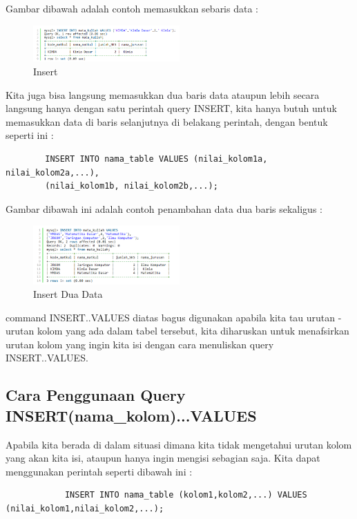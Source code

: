 	Gambar dibawah adalah contoh memasukkan sebaris data :
	
	\begin{figure}[ht]
			\centerline{\includegraphics[width=0.5\textwidth]{figures/insert.png}}
			\caption{Insert}
			\label{insert}
			\end{figure}
			
	Kita juga bisa langsung memasukkan dua baris data ataupun lebih secara langsung hanya dengan satu perintah query INSERT, kita hanya butuh untuk memasukkan data di baris selanjutnya di belakang perintah, dengan bentuk seperti ini :
	
	\begin{verbatim}
		INSERT INTO nama_table VALUES (nilai_kolom1a, nilai_kolom2a,...), 
		(nilai_kolom1b, nilai_kolom2b,...);
	\end{verbatim}
	
	Gambar dibawah ini adalah contoh penambahan data dua baris sekaligus :
	
	\begin{figure}[ht]
			\centerline{\includegraphics[width=0.5\textwidth]{figures/insert2.png}}
			\caption{Insert Dua Data}
			\label{insert2}
			\end{figure}
	
	command INSERT..VALUES diatas bagus digunakan apabila kita tau urutan - urutan kolom yang ada dalam tabel tersebut, kita diharuskan untuk menafsirkan urutan kolom yang ingin kita isi dengan cara menuliskan query INSERT..VALUES.
	
	\subsection{Cara Penggunaan Query INSERT(nama_kolom)...VALUES}
	Apabila kita berada di dalam situasi dimana kita tidak mengetahui urutan kolom yang akan kita isi, ataupun hanya ingin mengisi sebagian saja. Kita dapat menggunakan perintah seperti dibawah ini :
		\begin{verbatim}
			INSERT INTO nama_table (kolom1,kolom2,...) VALUES (nilai_kolom1,nilai_kolom2,...);
		\end{verbatim}
		
